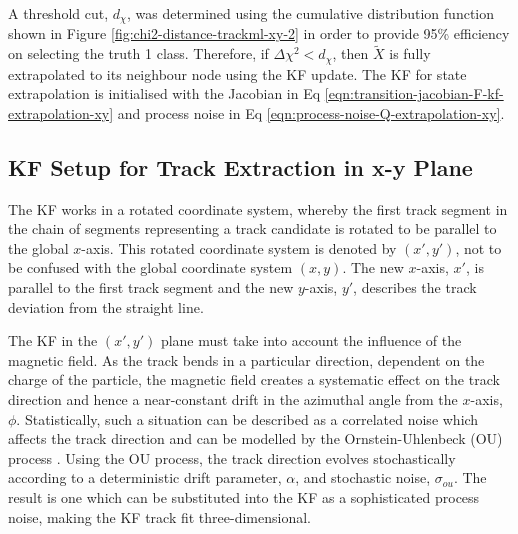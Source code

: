 A threshold cut, $d_{\chi}$, was determined using the cumulative distribution function shown in Figure \ref{fig:chi2-distance-trackml-xy-2} in order to provide 95\% efficiency on selecting the truth 1 class. Therefore, if $\Delta \chi^{2} < d_{\chi}$, then $\tilde{X}$ is fully extrapolated to its neighbour node using the KF update. The KF for state extrapolation is initialised with the Jacobian in Eq \eqref{eqn:transition-jacobian-F-kf-extrapolation-xy} and process noise in Eq \eqref{eqn:process-noise-Q-extrapolation-xy}.









\clearpage
\subsection{KF Setup for Track Extraction in x-y Plane}
\label{chapter-6-derivation-part-2}

The KF works in a rotated coordinate system, whereby the first track segment in the chain of segments representing a track candidate is rotated to be parallel to the global $x$-axis. This rotated coordinate system is denoted by $(x', y')$, not to be confused with the global coordinate system $(x, y)$. The new $x$-axis, $x'$, is parallel to the first track segment and the new $y$-axis, $y'$, describes the track deviation from the straight line.

The KF in the $(x', y')$ plane must take into account the influence of the magnetic field. As the track bends in a particular direction, dependent on the charge of the particle, the magnetic field creates a systematic effect on the track direction and hence a near-constant drift in the azimuthal angle from the $x$-axis, $\phi$. Statistically, such a situation can be described as a correlated noise which affects the track direction and can be modelled by the Ornstein-Uhlenbeck (OU) process \cite{OU}. Using the OU process, the track direction evolves stochastically according to a deterministic drift parameter, $\alpha$, and stochastic noise, $\sigma_{ou}$. The result is one which can be substituted into the KF as a sophisticated process noise, making the KF track fit three-dimensional.

